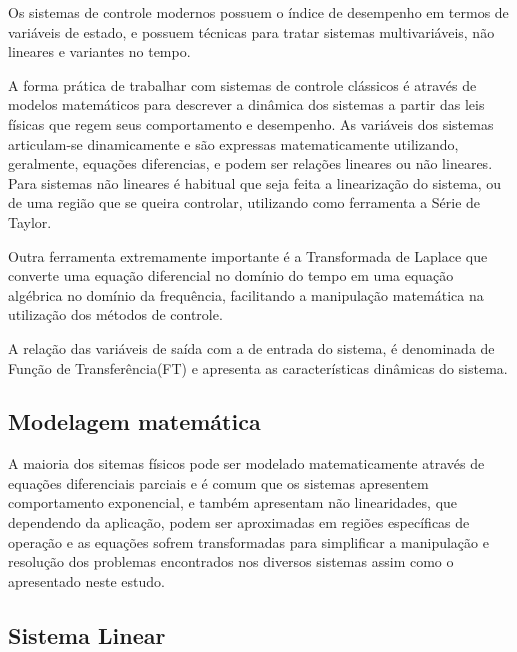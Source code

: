 Os sistemas de controle modernos possuem o índice de desempenho em termos de variáveis de estado, e possuem técnicas para tratar sistemas multivariáveis, não lineares e variantes no tempo.

A forma prática de trabalhar com sistemas de controle clássicos é através de modelos matemáticos para descrever a dinâmica dos sistemas a partir das leis físicas que regem seus comportamento e desempenho.
As variáveis dos sistemas articulam-se dinamicamente e são expressas matematicamente utilizando, geralmente, equações diferencias, e podem ser relações lineares ou não lineares. 
Para sistemas não lineares é habitual que seja feita a linearização do sistema, ou de uma região que se queira controlar, utilizando como ferramenta a Série de Taylor. 

Outra ferramenta extremamente importante é a Transformada de Laplace que converte uma equação diferencial no domínio do tempo em uma equação algébrica no domínio da frequência, facilitando a manipulação matemática na utilização dos métodos de controle. 

A relação das variáveis de saída com a de entrada do sistema, é denominada de Função de Transferência(FT) %
e apresenta as características dinâmicas do sistema.



\subsection{Modelagem matemática}

A maioria dos sitemas físicos pode ser modelado matematicamente através de equações diferenciais parciais e é comum que os sistemas apresentem comportamento exponencial, e também apresentam não linearidades, que dependendo da aplicação, podem ser aproximadas em regiões específicas de operação e as equações sofrem transformadas para simplificar a manipulação e resolução dos problemas encontrados nos diversos sistemas assim como o apresentado neste estudo.


\subsection{Sistema Linear}

